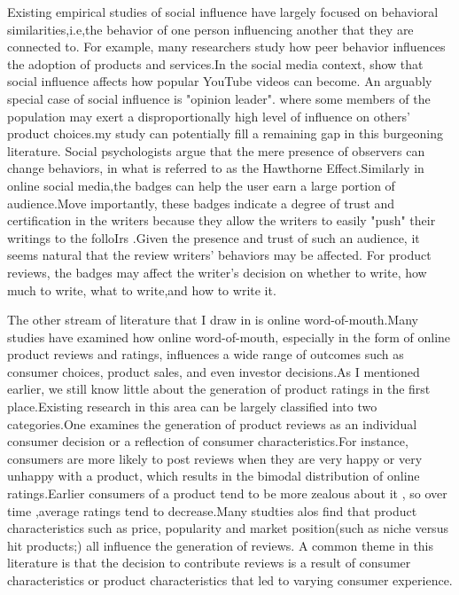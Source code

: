 \documentclass[12pt]{article}%
\begin{document}
Existing empirical studies of social influence have largely focused on behavioral similarities,i.e,the behavior of one person influencing another that they are connected to. For example, many researchers study how peer behavior influences the adoption of products and services\citep{aral2009distinguishing,lorenz2011social}.In the social media context, \cite{susarla2012social} show that social influence affects how popular YouTube videos can become. An arguably special case of social influence is "opinion leader". where some members of the population may exert a disproportionally high level of influence on others' product choices.my study can potentially fill a remaining gap in this burgeoning literature. Social psychologists argue that the mere presence of observers can change behaviors, in what is referred to as the Hawthorne Effect\citep{adair1984hawthorne}.Similarly in online social media,the badges can help the user earn a large portion of audience.Move importantly, these badges indicate a degree of trust and certification in the writers because they allow the writers to easily "push" their writings to the folloIrs .Given the presence and trust of such an audience, it seems natural that the review writers' behaviors may be affected. For product reviews, the badges may affect the writer's decision on whether to write, how much to write, what to write,and how to write it.

The other stream of literature that I draw in is online word-of-mouth.Many studies have examined how online word-of-mouth, especially in the form of online product reviews and ratings, influences a wide range of outcomes such as consumer choices, product sales, and even investor decisions\citep{aggarwal2012putting,dellarocas2003digitization,duan2008online,sun2012does,zhang2011group}.As I mentioned earlier, we still know little about the generation of product ratings in the first place.Existing research in this area can be largely classified into two categories.One examines the generation of product reviews as an individual consumer decision or a reflection of consumer characteristics.For instance, consumers are more likely to post reviews when they are very happy or very unhappy with a product, which results in the bimodal distribution of online ratings\citep{hu2006}.Earlier consumers of a product tend to be more zealous about it , so over time ,average ratings tend to decrease\citep{hu2006}.Many studties alos find that product characteristics such as price\citep{li2008self}, popularity\cite{zhang2011group} and market position(such as niche versus hit products;\citet{dellarocas2010consumers}) all influence the generation of reviews. A common theme in this literature is that the decision to contribute reviews is a result of consumer characteristics or product characteristics that led to varying consumer experience.
\end{document}
